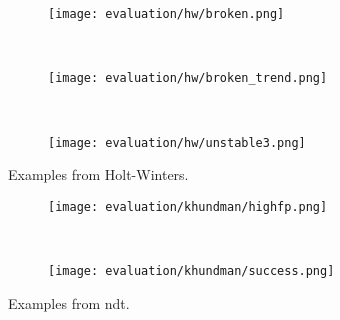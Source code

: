 \begin{figure}[htp!]
    \begin{subfigure}[b]{\linewidth}
        \centering
        \texttt{[image: evaluation/hw/broken.png]}
        \label{fig:hw-instability}
    \end{subfigure}\label{fig:hw-broken}
    \\
    \begin{subfigure}[b]{\linewidth}
        \centering
        \texttt{[image: evaluation/hw/broken\_trend.png]}
        \label{fig:hw-trend-instability}
    \end{subfigure}
    \\
    \begin{subfigure}[b]{\linewidth}
        \centering
        \texttt{[image: evaluation/hw/unstable3.png]}
        \label{fig:hw-ordinary}
    \end{subfigure}
    \caption{Examples from Holt-Winters.}\label{fig:hw-output}
\end{figure}

\begin{figure}[htp!]
    \begin{subfigure}[b]{\linewidth}
        \centering
        \texttt{[image: evaluation/khundman/highfp.png]}
        \label{fig:khundman-fp}
    \end{subfigure}%
    \\
    \begin{subfigure}[b]{\linewidth}
        \centering
        \texttt{[image: evaluation/khundman/success.png]}
        \label{fig:khundman-success}
    \end{subfigure}
    \caption{Examples from \gls{ndt}.}\label{fig:khundman-output}
\end{figure}

